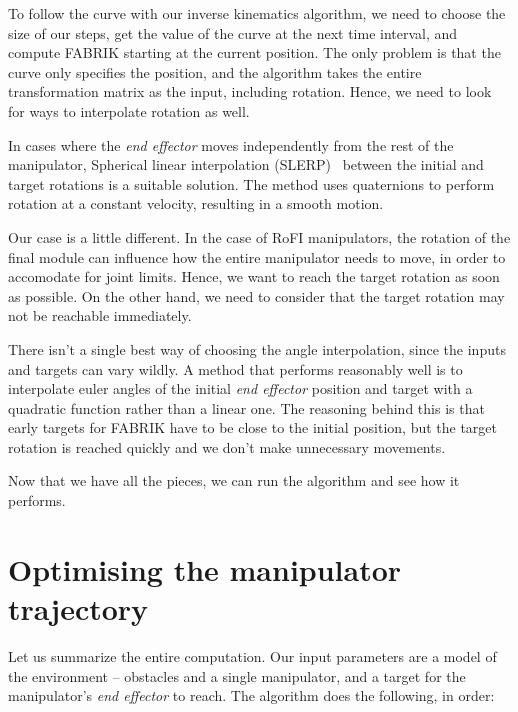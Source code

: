To follow the curve with our inverse kinematics algorithm, we need to choose the size of our steps, get the value of the curve at the next time interval, and compute FABRIK starting at the current position. The only problem is that the curve only specifies the position, and the algorithm takes the entire transformation matrix as the input, including rotation. Hence, we need to look for ways to interpolate rotation as well.

In cases where the \textit{end effector} moves independently from the rest of the manipulator, Spherical linear interpolation (SLERP)~\cite{slerp} between the initial and target rotations is a suitable solution. The method uses quaternions to perform rotation at a constant velocity, resulting in a smooth motion.

Our case is a little different. In the case of RoFI manipulators, the rotation of the final module can influence how the entire manipulator needs to move, in order to accomodate for joint limits. Hence, we want to reach the target rotation as soon as possible. On the other hand, we need to consider that the target rotation may not be reachable immediately.

There isn't a single best way of choosing the angle interpolation, since the inputs and targets can vary wildly. A method that performs reasonably well is to interpolate euler angles of the initial \textit{end effector} position and target with a quadratic function rather than a linear one. The reasoning behind this is that early targets for FABRIK have to be close to the initial position, but the target rotation is reached quickly and we don't make unnecessary movements.

Now that we have all the pieces, we can run the algorithm and see how it performs.

\section{Optimising the manipulator trajectory}

Let us summarize the entire computation. Our input parameters are a model of the environment -- obstacles and a single manipulator, and a target for the manipulator's \textit{end effector} to reach. The algorithm does the following, in order:

